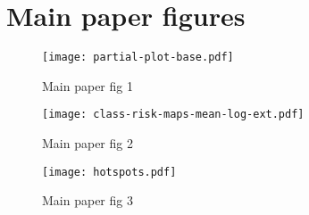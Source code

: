 \documentclass[11pt]{article}
\begin{document}
\clearpage

\section{Main paper figures}

\begin{figure}[htbp]
\begin{center}
\texttt{[image: partial-plot-base.pdf]}
\caption{Main paper fig 1}
\label{fig:1}
\end{center}
\end{figure}

\begin{figure}[htbp]
\begin{center}
\texttt{[image: class-risk-maps-mean-log-ext.pdf]}
\caption{Main paper fig 2}
\label{fig:2}
\end{center}
\end{figure}

\begin{figure}[htbp]
\begin{center}
\texttt{[image: hotspots.pdf]}
\caption{Main paper fig 3}
\label{fig:3}
\end{center}
\end{figure}
\end{document}
